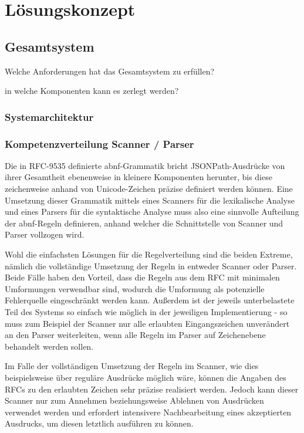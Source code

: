 \documentclass[oneside]{ausarbeitung}
\begin{document}
	
	
	
	
	\chapter{Lösungskonzept}
	\label{chapt_loesungskonzept}
	
	\section{Gesamtsystem}
	Welche Anforderungen hat das Gesamtsystem zu erfüllen?

	in welche Komponenten kann es zerlegt werden?
	
	
	
	\subsection{Systemarchitektur}
	
	
	\subsection{Kompetenzverteilung Scanner / Parser}
	
	Die in RFC-9535 definierte \ac{abnf}-Grammatik bricht JSONPath-Ausdrücke von ihrer Gesamtheit ebenenweise in kleinere Komponenten herunter, bis diese zeichenweise anhand von Unicode-Zeichen präzise definiert werden können. Eine Umsetzung dieser Grammatik mittels eines Scanners für die lexikalische Analyse und eines Parsers für die syntaktische Analyse muss also eine sinnvolle Aufteilung der \ac{abnf}-Regeln definieren, anhand welcher die Schnittstelle von Scanner und Parser vollzogen wird.
	
	Wohl die einfachsten Lösungen für die Regelverteilung sind die beiden Extreme, nämlich die vollständige Umsetzung der Regeln in entweder Scanner oder Parser. Beide Fälle haben den Vorteil, dass die Regeln aus dem RFC mit minimalen Umformungen verwendbar sind, wodurch die Umformung als potenzielle Fehlerquelle eingeschränkt werden kann. Außerdem ist der jeweils unterbelastete Teil des Systems so einfach wie möglich in der jeweiligen Implementierung - so muss zum Beispiel der Scanner nur alle erlaubten Eingangszeichen unverändert an den Parser weiterleiten, wenn alle Regeln im Parser auf Zeichenebene behandelt werden sollen. 
	
	Im Falle der vollständigen Umsetzung der Regeln im Scanner, wie dies beispielsweise über reguläre Ausdrücke möglich wäre, können die Angaben des RFCs zu den erlaubten Zeichen sehr präzise realisiert werden. Jedoch kann dieser Scanner nur zum Annehmen beziehungsweise Ablehnen von Ausdrücken verwendet werden und erfordert intensivere Nachbearbeitung eines akzeptierten Ausdrucks, um diesen letztlich ausführen zu können.
	
\end{document}
